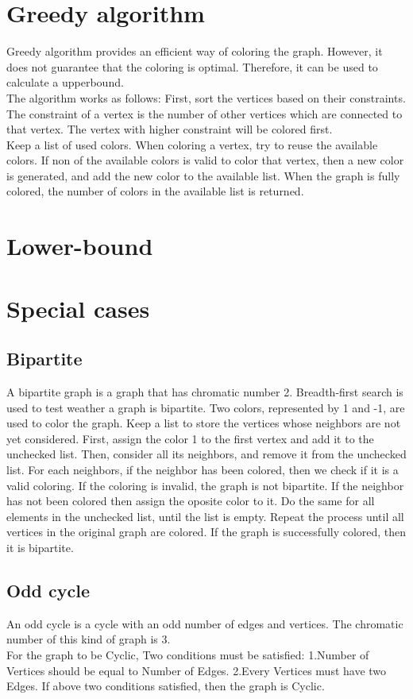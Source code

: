 \documentclass[a4paper]{report}
\begin{document}
		\section{Greedy algorithm}
		Greedy algorithm provides an efficient way of coloring the graph. However,  it does not guarantee that the coloring is optimal. Therefore, it can be used to calculate a upperbound. \\
		The algorithm works as follows:
		First, sort the vertices based on their constraints. The constraint of a vertex is  the number of other vertices which are connected to that vertex. The vertex with higher constraint will be colored first.\\
		Keep a list of used colors. When coloring a vertex, try to reuse the available colors. If non of the available colors is valid to color that vertex, then  a new color is generated, and add the new color to the available list. When the graph is fully colored, the number of colors in the available list is returned.\\
		
		\section{Lower-bound}
		
		\section{Special cases}
			\subsection{Bipartite}
			A bipartite graph is a graph that has chromatic number 2. Breadth-first search is used to test weather a graph is bipartite. Two colors, represented by 1 and -1, are used to color the graph. Keep a list to store the vertices whose neighbors are not yet considered. First, assign the color 1 to the first vertex and add it to the unchecked list. Then, consider all its neighbors, and remove it from the unchecked list. For each neighbors, if the neighbor has been colored, then we check if it is a valid coloring. If the coloring is invalid, the graph is not bipartite. If the neighbor has not been colored then assign the oposite color to it. Do the same for all elements in the unchecked list, until the list is empty. Repeat the process until all vertices in the original graph are colored. If the graph is successfully colored, then it is bipartite.
			\subsection{Odd cycle}
			An odd cycle is a cycle with an odd number of edges and vertices. The chromatic number of this kind of graph is 3. \\
			For the graph to be Cyclic, Two conditions must be satisfied:
			1.Number of Vertices should be equal to Number of Edges.
			2.Every Vertices must have two Edges.
			If above two conditions satisfied, then  the graph is Cyclic.
			
\end{document}
